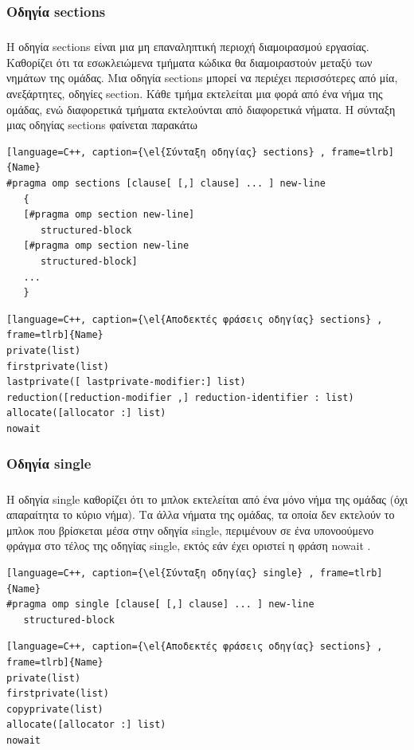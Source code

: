 \documentclass[12pt]{article}
\newcommand{\en}[1]{\foreignlanguage{english}{#1}}
\newcommand{\el}[1]{\selectlanguage{greek}{#1}\selectlanguage{english}}
\begin{document}
\subsubsection{Οδηγία \en{sections}}
\subparagraph{}

      Η οδηγία \en{sections} είναι μια μη επαναληπτική περιοχή διαμοιρασμού εργασίας. Καθορίζει ότι τα εσωκλειώμενα τμήματα κώδικα θα διαμοιραστούν μεταξύ των νημάτων της ομάδας. Μια οδηγία \en{sections} μπορεί να περιέχει περισσότερες από μία, ανεξάρτητες, οδηγίες section. Κάθε τμήμα εκτελείται μια φορά από ένα νήμα της ομάδας, ενώ διαφορετικά τμήματα εκτελούνται από διαφορετικά νήματα. Η σύνταξη μιας οδηγίας sections φαίνεται παρακάτω\cite{pdplab}

\begin{lstlisting}[language=C++, caption={\el{Σύνταξη οδηγίας} sections} , frame=tlrb]{Name}
#pragma omp sections [clause[ [,] clause] ... ] new-line 
   { 
   [#pragma omp section new-line] 
      structured-block 
   [#pragma omp section new-line 
      structured-block] 
   ... 
   }
\end{lstlisting}

\begin{lstlisting}[language=C++, caption={\el{Αποδεκτές φράσεις οδηγίας} sections} , frame=tlrb]{Name}
private(list) 
firstprivate(list) 
lastprivate([ lastprivate-modifier:] list) 
reduction([reduction-modifier ,] reduction-identifier : list) 
allocate([allocator :] list) 
nowait
\end{lstlisting}

\subsubsection{Οδηγία \en{single}}
\subparagraph{}
Η οδηγία \en{single} καθορίζει ότι το μπλοκ εκτελείται από ένα μόνο νήμα της ομάδας (όχι απαραίτητα το κύριο νήμα). Τα άλλα νήματα της ομάδας, τα οποία δεν εκτελούν το μπλοκ που βρίσκεται μέσα στην οδηγία single, περιμένουν σε ένα υπονοούμενο φράγμα στο τέλος της οδηγίας \en{single}, εκτός εάν έχει οριστεί η φράση \en{nowait} \cite{openmpse16}.

\begin{lstlisting}[language=C++, caption={\el{Σύνταξη οδηγίας} single} , frame=tlrb]{Name} 
#pragma omp single [clause[ [,] clause] ... ] new-line 
   structured-block
\end{lstlisting}

\begin{lstlisting}[language=C++, caption={\el{Αποδεκτές φράσεις οδηγίας} sections} , frame=tlrb]{Name}
private(list) 
firstprivate(list) 
copyprivate(list) 
allocate([allocator :] list) 
nowait
\end{lstlisting}
\end{document}
